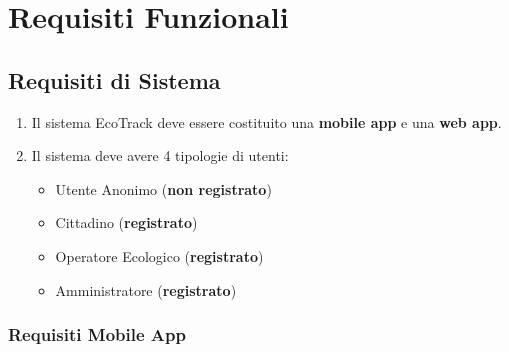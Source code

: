\section{Requisiti Funzionali}

\subsection{Requisiti di Sistema} \label{Requisiti di Sistema}

\begin{enumerate}[start=1,label=\textbf{RF\theenumi}, labelwidth=4em, left=0pt, labelsep=1em, align=left]

    \item \label{itm:RF1} Il sistema EcoTrack deve essere costituito una \textbf{mobile app} e una \textbf{web app}.
    
    \item \label{itm:RF2} Il sistema deve avere 4 tipologie di utenti:
    \begin{itemize}
        \item Utente Anonimo (\textbf{non registrato})
        \item Cittadino (\textbf{registrato})
        \item Operatore Ecologico (\textbf{registrato})
        \item Amministratore (\textbf{registrato})
    \end{itemize}
    
\end{enumerate}

\subsubsection{Requisiti Mobile App}

